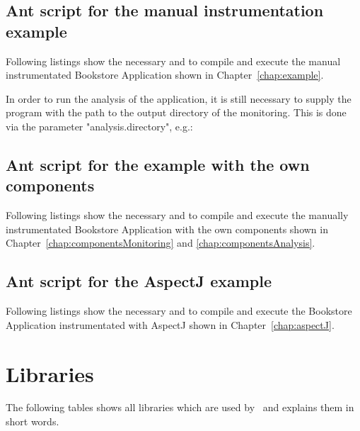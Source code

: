     \subsection{Ant script for the manual instrumentation example}
      Following listings show the necessary  and  to compile and execute the manual instrumentated Bookstore Application shown in Chapter~\ref{chap:example}.
      \setXMLListing
      
      
      In order to run the analysis of the application, it is still necessary to supply the program with the path to the output directory of the monitoring. This is done via the parameter "analysis.directory", e.g.:
      \setBashListing
      

    \subsection{Ant script for the example with the own components}
      Following listings show the necessary  and  to compile and execute the manually instrumentated Bookstore Application with the own components shown in Chapter~\ref{chap:componentsMonitoring} and \ref{chap:componentsAnalysis}.
      \setXMLListing
      
      

    \subsection{Ant script for the AspectJ example}
      Following listings show the necessary  and  to compile and execute the Bookstore Application instrumentated with AspectJ shown in Chapter~\ref{chap:aspectJ}.
      \setXMLListing
      
           

\newpage
  \section{Libraries}
    The following tables shows all libraries which are used by \Kieker\ and explains them in short words.
    


